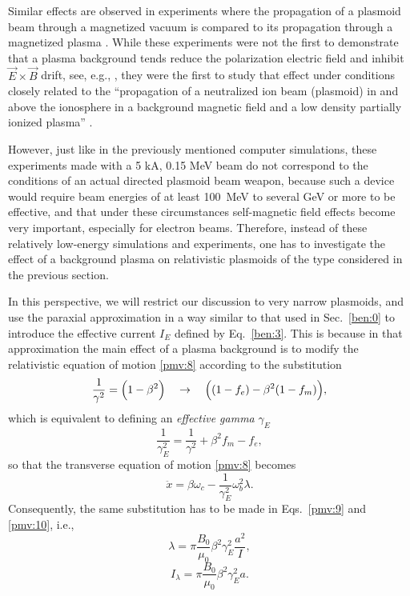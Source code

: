 \documentclass [12pt,a4paper,     ]{report} %
\begin{document}
   Similar effects are observed in experiments where the propagation of a plasmoid beam through a magnetized vacuum is compared to its propagation through a magnetized plasma  \cite{HONG-1988-, WESSE1988-}.  While these experiments were not the first to demonstrate that a plasma background tends reduce the polarization electric field and inhibit $\vec E \times \vec B$ drift, see, e.g., \cite[Fig.20]{BOSTI1956-}, they were the first to study that effect under conditions closely related to the ``propagation of a neutralized ion beam (plasmoid) in and above the ionosphere in a background magnetic field and a low density partially ionized plasma'' \cite[p.3778]{WESSE1988-}.

  However, just like in the previously mentioned computer simulations, these experiments made with a 5 kA, 0.15 MeV beam do not correspond to the conditions of an actual directed plasmoid beam weapon, because such a device would require beam energies of at least 100~MeV to several GeV or more to be effective, and that under these circumstances self-magnetic field effects become very important, especially for electron beams.  Therefore, instead of these relatively low-energy simulations and experiments, one has to investigate the effect of a background plasma on relativistic plasmoids of the type considered in the previous section. 

   In this perspective, we will restrict our discussion to very narrow plasmoids, and use the paraxial approximation in a way similar to that used in Sec.~\ref{ben:0} to introduce the effective current $I_E$ defined by Eq.~\eqref{ben:3}.   This is because in that approximation the main effect of a plasma background is to modify the relativistic equation of motion \eqref{pmv:8} according to the substitution
%
\begin{equation}\label{pmp:1} 
    \frac{1}{\gamma^2} = \Bigl(1-\beta^2\Bigr) ~~~ \rightarrow ~~~
                         \Bigl((1-f_e) - \beta^2(1-f_m)\Bigr),
\end{equation}
%
which is equivalent to defining an \emph{effective gamma} $\gamma_E$
%
\begin{equation}\label{pmp:2} 
    \frac{1}{\gamma^2_E}  = \frac{1}{\gamma^2} + \beta^2 f_m -f_e,
\end{equation}
%
so that the transverse equation of motion \eqref{pmv:8} becomes
%
\begin{equation}\label{pmp:3} 
         \ddot x = \beta \omega_c - \frac{1}{\gamma^2_E} \omega_b^2 \lambda.
\end{equation}
%
   Consequently, the same substitution has to be made in Eqs.~\eqref{pmv:9} and \eqref{pmv:10}, i.e., 
%
\begin{equation}\label{pmp:4} 
     \lambda = \pi \frac{B_0}{\mu_0} \beta^2\gamma^2_E \frac{a^2}{I},
\end{equation}
%
%
\begin{equation}\label{pmp:5} 
         I_{\lambda} = \pi \frac{B_0}{\mu_0} \beta^2 \gamma^2_E a.
\end{equation}
%
\end{document}
